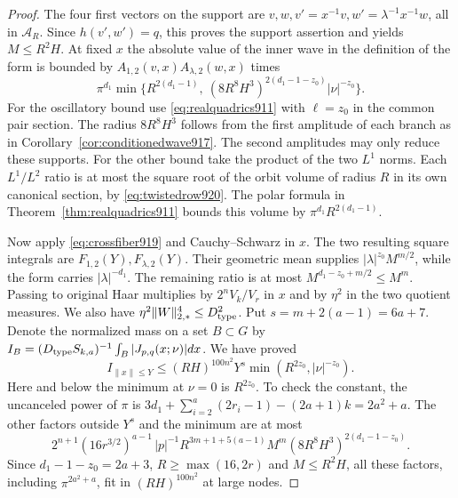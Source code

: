 \documentclass[a4paper,11pt]{article}
\theoremstyle{definition}
\theoremstyle{remark}
\numberwithin{equation}{section}
\begin{document}
\begin{proof}
The four first vectors on the support are
\(v,w,v'=x^{-1}v,w'=\lambda^{-1}x^{-1}w\), all in
\(\mathcal A_R\). Since \(h(v',w')=q\), this proves the
support assertion and yields \(M\le R^2H\).
At fixed \(x\) the absolute value of the inner wave
in the definition of the form is bounded by
\(A_{1,2}(v,x)A_{\lambda,2}(w,x)\) times
\[
     \pi^{d_1}\min\{R^{2(d_1-1)},\
       (8R^8H^3)^{2(d_1-1-z_0)}|\nu|^{-z_0}\}.
\]
For the oscillatory bound use \eqref{eq:realquadrics911}
with \(\ell=z_0\) in the common pair section. The radius
\(8R^8H^3\) follows from the first amplitude of each branch
as in Corollary~\ref{cor:conditionedwave917}. The second
amplitudes may only reduce these supports. For the other
bound take the product of the two \(L^1\) norms. Each
\(L^1/L^2\) ratio is at most the square root of the orbit
volume of radius \(R\) in its own canonical section, by
\eqref{eq:twistedrow920}. The polar formula in
Theorem~\ref{thm:realquadrics911} bounds this volume by
\(\pi^{d_1}R^{2(d_1-1)}\).

Now apply \eqref{eq:crossfiber919} and Cauchy--Schwarz in
\(x\). The two resulting square integrals are
\(F_{1,2}(Y),F_{\lambda,2}(Y)\). Their geometric mean supplies
\(|\lambda|^{z_0} M^{m/2}\), while the form carries
\(|\lambda|^{-d_1}\). The remaining ratio is at most
\(M^{d_1-z_0+m/2}\le M^m\). Passing to original Haar
multiplies by \(2^n V_k/V_r\) in \(x\) and by \(\eta^2\)
in the two quotient measures. We also have \(\eta^2\|W\|_{2,*}^4\le D_{\rm type}^2\).
Put \(s=m+2(a-1)=6a+7\). Denote the normalized mass on a
set \(B\subset G\) by \(I_B=(D_{\rm type}S_{k,a})^{-1}
\int_B |J_{p,q}(x;\nu)|dx\). We have proved
\begin{equation}
 I_{\|x\|\le Y}
 \le (RH)^{100n^2}Y^s
                \min(R^{2z_0},|\nu|^{-z_0}).
 \label{eq:secondball920}
\end{equation}
Here and below the minimum at \(\nu=0\) is \(R^{2z_0}\).
To check the constant, the uncanceled power of \(\pi\) is
\(3d_1+\sum_{i=2}^a(2r_i-1)-(2a+1)k=2a^2+a\).
The other factors outside \(Y^s\) and the minimum are at most
\[
  2^{n+1}(16r^{3/2})^{a-1}\,
     |p|^{-1}R^{3m+1+5(a-1)}
           M^m(8R^8H^3)^{2(d_1-1-z_0)} .
\]
Since \(d_1-1-z_0=2a+3\), \(R\ge\max(16,2r)\) and
\(M\le R^2H\), all these factors, including \(\pi^{2a^2+a}\),
fit in \((RH)^{100n^2}\) at large nodes.


\end{proof}
\end{document}

